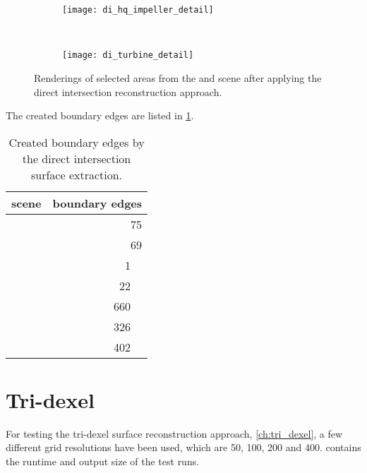 \begin{figure}
	\centering
	\begin{subfigure}[b]{\textwidth}
		\centering
		\texttt{[image: di\_hq\_impeller\_detail]}
		\caption{\impeller}
		\label{fig:di_impeller_detail}
	\end{subfigure}\\
	\begin{subfigure}[b]{\textwidth}
		\centering
		\texttt{[image: di\_turbine\_detail]}
		\caption{\turbine}
		\label{fig:di_turbine_detail}
	\end{subfigure}
	\caption{
		Renderings of selected areas from the \impeller {} and \turbine {} scene after applying the direct intersection reconstruction approach.
	}
	\label{fig:di_scenes_artifacts}
\end{figure}

The created boundary edges are listed in \cref{tbl:direct_intersection_boundary_edges}.

\begin{table}
	\centering
	\begin{tabular}{l|r}
		scene         &  boundary edges         \\
		\midrule
		\cubes        & \SI{ 75}{     \nothing} \\
		\cylindersd   & \SI{ 69}{     \nothing} \\
		\cylinders    & \SI{  1}{\kilo\nothing} \\ %
		\cylinderhead & \SI{ 22}{\kilo\nothing} \\ %
		\impeller     & \SI{660}{\kilo\nothing} \\ %
		\impellerhalf & \SI{326}{\kilo\nothing} \\ %
		\turbine      & \SI{402}{\kilo\nothing} \\ %
	\end{tabular}
	\caption{
		Created boundary edges by the direct intersection surface extraction.
	}
	\label{tbl:direct_intersection_boundary_edges}
\end{table}


\section{Tri-dexel}
\label{sec:tri_dexel_results}

For testing the tri-dexel surface reconstruction approach, \cf \cref{ch:tri_dexel}, a few different grid resolutions have been used, which are 50, 100, 200 and 400.
 contains the runtime and output size of the test runs.


